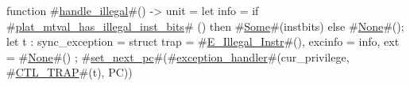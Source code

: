 function #\hyperref[sailRISCVzhandlezyillegal]{handle\_illegal}#() -> unit = {
  let info = if #\hyperref[sailRISCVzplatzymtvalzyhaszyillegalzyinstzybits]{plat\_mtval\_has\_illegal\_inst\_bits}# ()
             then #\hyperref[sailRISCVzSome]{Some}#(instbits)
             else #\hyperref[sailRISCVzNone]{None}#();
  let t : sync_exception = struct { trap    = #\hyperref[sailRISCVzEzyIllegalzyInstr]{E\_Illegal\_Instr}#(),
                                    excinfo = info,
                                    ext     = #\hyperref[sailRISCVzNone]{None}#() };
  #\hyperref[sailRISCVzsetzynextzypc]{set\_next\_pc}#(#\hyperref[sailRISCVzexceptionzyhandler]{exception\_handler}#(cur_privilege, #\hyperref[sailRISCVzCTLzyTRAP]{CTL\_TRAP}#(t), PC))
}
